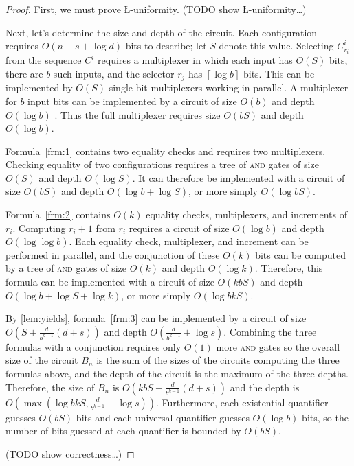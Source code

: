 \documentclass{article}
\begin{document}
\begin{proof}
  First, we must prove \L-uniformity.
  (TODO show \L-uniformity\ldots)

  Next, let's determine the size and depth of the circuit.
  Each configuration requires $O(n + s + \log d)$ bits to describe; let $S$ denote this value.
  Selecting $C^i_{r_i}$ from the sequence $C^i$ requires a multiplexer in which each input has $O(S)$ bits, there are $b$ such inputs, and the selector $r_j$ has $\left\lceil\log b\right\rceil$ bits.
  This can be implemented by $O(S)$ single-bit multiplexers working in parallel.
  A multiplexer for $b$ input bits can be implemented by a circuit of size $O(b)$ and depth $O(\log b)$ \autocite[Lemma~2.5.5]{savage98}.
  Thus the full multiplexer requires size $O(b S)$ and depth $O(\log b)$.

  Formula~\eqref{frm:1} contains two equality checks and requires two multiplexers.
  Checking equality of two configurations requires a tree of \textsc{and} gates of size $O(S)$ and depth $O(\log S)$.
  It can therefore be implemented with a circuit of size $O(b S)$ and depth $O(\log b + \log S)$, or more simply $O(\log b S)$.

  Formula~\eqref{frm:2} contains $O(k)$ equality checks, multiplexers, and increments of $r_i$.
  Computing $r_i + 1$ from $r_i$ requires a circuit of size $O(\log b)$ and depth $O(\log \log b)$.
  Each equality check, multiplexer, and increment can be performed in parallel, and the conjunction of these $O(k)$ bits can be computed by a tree of \textsc{and} gates of size $O(k)$ and depth $O(\log k)$.
  Therefore, this formula can be implemented with a circuit of size $O(k b S)$ and depth $O(\log b + \log S + \log k)$, or more simply $O(\log b k S)$.
  
  By \autoref{lem:yields}, formula~\eqref{frm:3} can be implemented by a circuit of size $O(S + \frac{d}{b^{k - 1}}(d + s))$ and depth $O(\frac{d}{b^{k - 1}} + \log s)$.
  Combining the three formulas with a conjunction requires only $O(1)$ more \textsc{and} gates so the overall size of the circuit $B_n$ is the sum of the sizes of the circuits computing the three formulas above, and the depth of the circuit is the maximum of the three depths.
  Therefore, the size of $B_n$ is $O(k b S + \frac{d}{b^{k - 1}} (d + s))$ and the depth is $O(\max(\log b k S, \frac{d}{b^{k - 1}} + \log s))$.
  Furthermore, each existential quantifier guesses $O(b S)$ bits and each universal quantifier guesses $O(\log b)$ bits, so the number of bits guessed at each quantifier is bounded by $O(b S)$.

  (TODO show correctness\ldots)


\end{proof}
\end{document}

